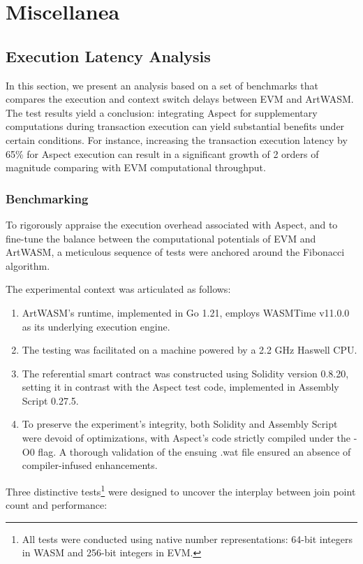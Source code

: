 \section{Miscellanea}

\subsection{Execution Latency Analysis}

In this section, we present an analysis based on a set of benchmarks that compares the execution and context switch delays between EVM and ArtWASM. The test results yield a conclusion: integrating Aspect for supplementary computations during transaction execution can yield substantial benefits under certain conditions. For instance, increasing the transaction execution latency by 65\% for Aspect execution can result in a significant growth of 2 orders of magnitude comparing with EVM computational throughput.

\subsubsection{Benchmarking}

To rigorously appraise the execution overhead associated with Aspect, and to fine-tune the balance between the computational potentials of EVM and ArtWASM, a meticulous sequence of tests were anchored around the Fibonacci algorithm.

The experimental context was articulated as follows:

\begin{enumerate}
  \item ArtWASM's runtime, implemented in Go 1.21, employs WASMTime v11.0.0 as its underlying execution engine.
  \item The testing was facilitated on a machine powered by a 2.2 GHz Haswell CPU.
  \item The referential smart contract was constructed using Solidity version 0.8.20, setting it in contrast with the Aspect test code, implemented in Assembly Script 0.27.5.
  \item To preserve the experiment's integrity, both Solidity and Assembly Script were devoid of optimizations, with Aspect's code strictly compiled under the -O0 flag. A thorough validation of the ensuing .wat file ensured an absence of compiler-infused enhancements.
\end{enumerate}

Three distinctive tests\footnote{All tests were conducted using native number representations: 64-bit integers in WASM and 256-bit integers in EVM.} were designed to uncover the interplay between join point count and performance:


